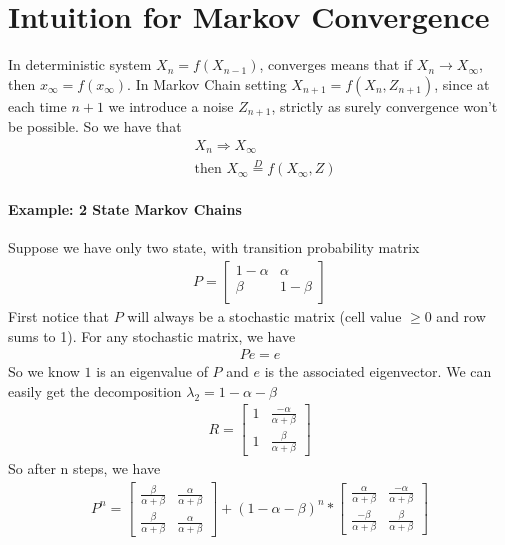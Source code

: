 \section{Intuition for Markov Convergence} 
In deterministic system $X_n = f(X_{n-1})$, converges means that if $X_n \to X_\infty$, then $x_\infty = f(x_\infty)$. In Markov Chain setting $X_{n+1}=f(X_n, Z_{n+1})$, since at each time $n+1$ we introduce a noise $Z_{n+1}$, strictly as surely convergence won't be possible. So we have that 
    \begin{align*}
        & X_n \Rightarrow X_\infty \\
        & \text{then } X_\infty \overset{D}{=}f(X_\infty, Z) \tag{a fresh $Z$}
    \end{align*}
\paragraph{Example: 2 State Markov Chains} Suppose we have only two state, with transition probability matrix 
    \begin{align*}
        P = 
        \begin{bmatrix}
            1 - \alpha & \alpha \\
            \beta & 1-\beta\\
        \end{bmatrix}
    \end{align*}
First notice that $P$ will always be a stochastic matrix (cell value $\geq 0$ and row sums to 1). For any stochastic matrix, we have 
    \begin{align*}
        Pe = e \tag{$e = $ col vector with all 1} 
    \end{align*}
So we know $1$ is an eigenvalue of $P$ and $e$ is the associated eigenvector. We can easily get the decomposition $\lambda_2 = 1 - \alpha - \beta$
    \begin{align*}
        R = \begin{bmatrix} 1 & \frac{-\alpha}{\alpha + \beta} \\ 1 & \frac{\beta}{\alpha + \beta}\end{bmatrix}
    \end{align*}
So after n steps, we have 
    \begin{align*}
        P^n = 
            \begin{bmatrix} 
                \frac{\beta}{\alpha+\beta} & \frac{\alpha}{\alpha+\beta} \\
                \frac{\beta}{\alpha+\beta} & \frac{\alpha}{\alpha+\beta}
            \end{bmatrix} 
            + 
            (1-\alpha - \beta)^n * 
            \begin{bmatrix}
                \frac{\alpha}{\alpha+\beta} & \frac{-\alpha}{\alpha+\beta} \\
                \frac{-\beta}{\alpha+\beta} & \frac{\beta}{\alpha+\beta}        
            \end{bmatrix}
    \end{align*}
